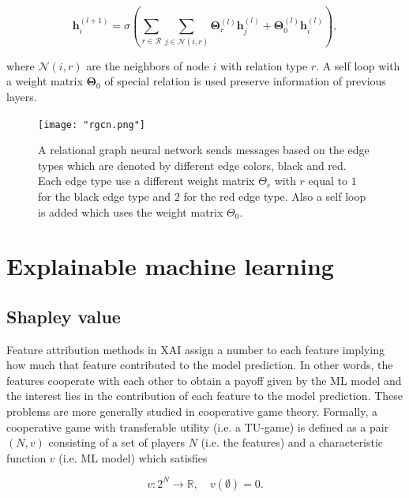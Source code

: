 \begin{equation}
	\pmb{h}^{(l+1)}_i = \sigma \left( \sum_{r \in \mathcal{R}} \sum_{j \in \mathcal{N}(i, r)} \pmb{\Theta}^{(l)}_r \pmb{h}^{(l)}_j
	+ \pmb{\Theta}^{(l)}_0 \pmb{h}^{(l)}_i \right),
\end{equation}


where $\mathcal{N}(i, r)$ are the neighbors of node $i$ with relation type $r$.
A self loop with a weight matrix $\pmb{\Theta}_0$ of special relation
is used preserve information of previous layers.

\begin{figure}[h]
    \centering 
    \texttt{[image: "rgcn.png"]}
    \caption{A relational graph neural network sends messages based on the edge 
    types which are denoted by different edge colors, black and red. Each edge 
    type use a different weight matrix $\Theta_r$ with $r$ equal to $1$ for the black 
    edge type and $2$ for the red edge type. Also a self loop is added which uses 
    the weight matrix $\Theta_0$.}
    \label{fig:rgcn}
\end{figure}


\section{Explainable machine learning}
\label{sec:xai}


\subsection{Shapley value}
\label{subsec:shapley_value}

Feature attribution methods in XAI assign a number to each feature implying how
much that feature contributed to the model prediction.\cite{merrick2020explanation}
In other words, the features cooperate with each other to obtain a payoff given
by the ML model and the interest lies in the contribution of each feature to the
model prediction. These problems are more generally studied in cooperative game
theory.\cite{branzei2008models} Formally, a cooperative game with transferable utility (i.e. a TU-game) is
defined as a pair $(N, v)$ consisting of a set of players $N$ (i.e. the features)
and a characteristic function $v$ (i.e. ML model) which satisfies\cite{zhang2022gstarx}


\begin{equation}
	v: 2^N \rightarrow \mathbb{R}, \quad v\left(\emptyset\right) = 0.
\end{equation}


